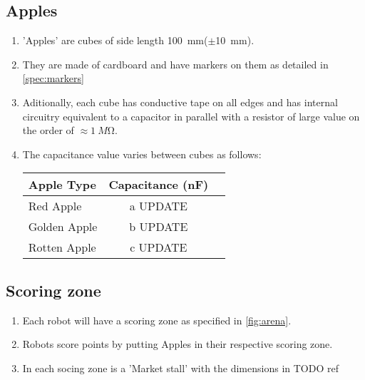 \subsection{Apples}
\label{spec:apples}

\begin{enumerate}
  \item 'Apples' are cubes of side length \SI{100}{mm}($\pm$\SI{10}{mm}).
  \item They are made of cardboard and have markers on them as detailed in \ref{spec:markers}
  \item Aditionally, each cube has conductive tape on all edges and has internal
        circuitry equivalent to a capacitor in parallel with a resistor of large value
        on the order of $\approx\SI{1}{M\ohm}$.
  \item The capacitance value varies between cubes as follows:
  \begin{center}
      \begin{tabular}{lcc}
            \toprule
            \textbf{Apple Type}     &     \textbf{Capacitance (\si{nF})}    \\
            \midrule
            Red Apple               &     a UPDATE       \\
            Golden Apple            &     b UPDATE       \\
            Rotten Apple            &     c UPDATE       \\
            \bottomrule
      \end{tabular}
  \end{center}

\end{enumerate}

\subsection{Scoring zone}
\label{spec:scoringZone}

\begin{enumerate}
      \item Each robot will have a scoring zone as specified in \ref{fig:arena}.
      \item Robots score points by putting Apples in their respective scoring zone.
      \item In each socing zone is a 'Market stall' with the dimensions in TODO ref{}
\end{enumerate}
